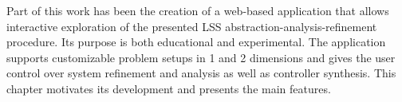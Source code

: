 Part of this work has been the creation of a web-based application that allows interactive exploration of the presented LSS abstraction-analysis-refinement procedure.
Its purpose is both educational and experimental.
The application supports customizable problem setups in 1 and 2 dimensions and gives the user control over system refinement and analysis as well as controller synthesis.
This chapter motivates its development and presents the main features.

